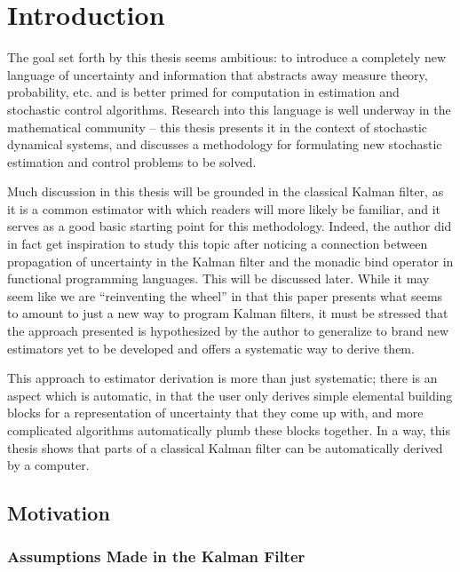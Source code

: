\newcommand{\normal}{\mathcal{N}}
\chapter{Introduction}

The goal set forth by this thesis seems ambitious: to introduce a completely new language of uncertainty and information that abstracts away measure theory, probability, etc. and is better primed for computation in estimation and stochastic control algorithms.
Research into this language is well underway in the mathematical community -- this thesis presents it in the context of stochastic dynamical systems, and discusses a methodology for formulating new stochastic estimation and control problems to be solved.

Much discussion in this thesis will be grounded in the classical Kalman filter, as it is a common estimator with which readers will more likely be familiar, and it serves as a good basic starting point for this methodology.
Indeed, the author did in fact get inspiration to study this topic after noticing a connection between propagation of uncertainty in the Kalman filter and the monadic bind operator in functional programming languages. This will be discussed later. While it may seem like we are ``reinventing the wheel'' in that this paper presents what seems to amount to just a new way to program Kalman filters, it must be stressed that the approach presented is hypothesized by the author to generalize to brand new estimators yet to be developed and offers a systematic way to derive them.

This approach to estimator derivation is more than just systematic; there is an aspect which is automatic, in that the user only derives simple elemental building blocks for a representation of uncertainty that they come up with, and more complicated algorithms automatically plumb these blocks together. In a way, this thesis shows that parts of a classical Kalman filter can be automatically derived by a computer.


\section{Motivation}


\subsection{Assumptions Made in the Kalman Filter}

